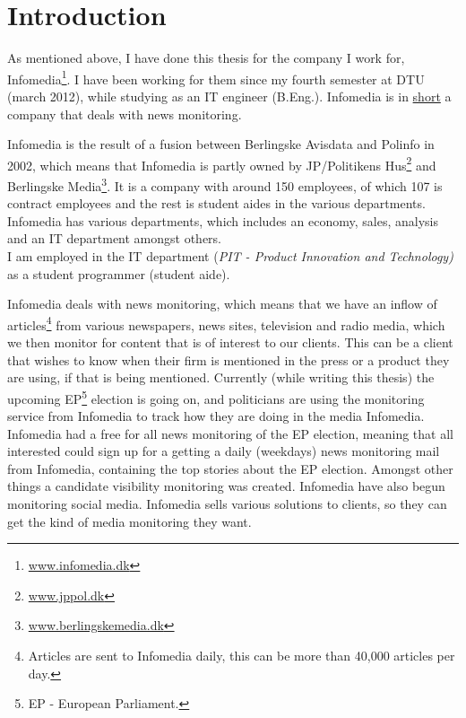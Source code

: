 \chapter{Introduction}
As mentioned above, I have done this thesis for the company I work for, Infomedia\footnote{\url{www.infomedia.dk}}. I have been working for them since my fourth semester at DTU (march 2012), while studying as an IT engineer (B.Eng.). Infomedia is in \underline{short} a company that deals with news monitoring.

Infomedia is the result of a fusion between Berlingske Avisdata and Polinfo in 2002, which means that Infomedia is partly owned by JP/Politikens Hus\footnote{\url{www.jppol.dk}} and Berlingske Media\footnote{\url{www.berlingskemedia.dk}}. It is a company with around 150 employees, of which 107 is contract employees and the rest is student aides in the various departments. Infomedia has various departments, which includes an economy, sales, analysis and an IT department amongst others.\\
I am employed in the IT department (\textit{PIT - Product Innovation and Technology)} as a student programmer (student aide).

Infomedia deals with news monitoring, which means that we have an inflow of articles\footnote{Articles are sent to Infomedia daily, this can be more than 40,000 articles per day.} from various newspapers, news sites, television and radio media, which we then monitor for content that is of interest to our clients. This can be a client that wishes to know when their firm is mentioned in the press or a product they are using, if that is being mentioned. 
Currently (while writing this thesis) the upcoming EP\footnote{EP - European Parliament.} election is going on, and politicians are using the monitoring service from Infomedia to track how they are doing in the media Infomedia\cite{EuropaValg}. Infomedia had a free for all news monitoring of the EP election, meaning that all interested could sign up for a getting a daily (weekdays) news monitoring mail from Infomedia, containing the top stories about the EP election. Amongst other things a candidate visibility monitoring was created\cite{InfomediaEpKandidater}. Infomedia have also begun monitoring social media. Infomedia sells various solutions to clients, so they can get the kind of media monitoring they want.

